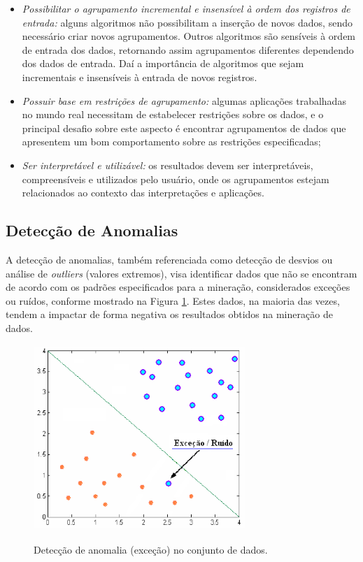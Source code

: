 \begin{itemize}
\item \textit{Possibilitar o agrupamento incremental e insensível à ordem dos registros de entrada:} alguns algoritmos não possibilitam a inserção de novos dados, sendo necessário criar novos agrupamentos. Outros algoritmos são sensíveis à ordem de entrada dos dados, retornando assim agrupamentos diferentes dependendo dos dados de entrada. Daí a importância de algoritmos que sejam incrementais e insensíveis à entrada de novos registros.

\item \textit{Possuir base em restrições de agrupamento:} algumas aplicações trabalhadas no mundo real necessitam de estabelecer restrições sobre os dados, e o principal desafio sobre este aspecto é encontrar agrupamentos de dados que apresentem um bom comportamento sobre as restrições especificadas;

\item \textit{Ser interpretável e utilizável:} os resultados devem ser interpretáveis, compreensíveis e utilizados pelo usuário, onde os agrupamentos estejam relacionados ao contexto das interpretações e aplicações.
\end{itemize}


\subsection{Detecção de Anomalias} \label{3subtitle5}

A detecção de anomalias, também referenciada como detecção de desvios ou análise de \textit{outliers} (valores extremos), visa identificar dados que não se encontram de acordo com os padrões especificados para a mineração, considerados exceções ou ruídos, conforme mostrado na Figura \ref{anomalias}. Estes dados, na maioria das vezes, tendem a impactar de forma negativa os resultados obtidos na mineração de dados.

\begin{figure}[!htb]
\centering
{\includegraphics[width=8cm,height=7cm]{images/anomalia}}
\caption {Detecção de anomalia (exceção) no conjunto de dados.}
\label{anomalias}
\end{figure}

